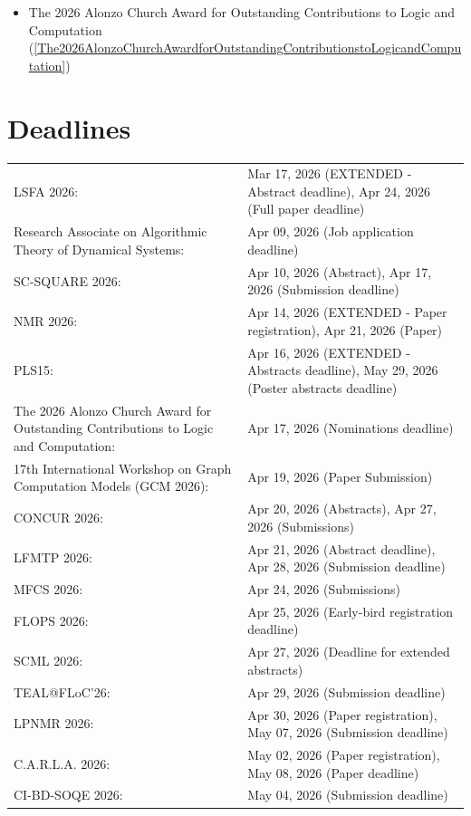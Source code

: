 \documentclass[prodmode,acmtecs]{acmsmall} %
\begin{document}
\begin{itemize}
\begin{itemize}\item The 2026 Alonzo Church Award for Outstanding Contributions to Logic and Computation (\cref{The2026AlonzoChurchAwardforOutstandingContributionstoLogicandComputation})
\end{itemize} 
\end{itemize}\section{Deadlines}\label{deadlines}\begin{tabulary}{\linewidth}{LL}LSFA 2026:  & Mar 17, 2026 (EXTENDED - Abstract deadline), Apr 24, 2026 (Full paper deadline) \\
Research Associate on Algorithmic Theory of Dynamical Systems:  & Apr 09, 2026 (Job application deadline) \\
SC-SQUARE 2026:  & Apr 10, 2026 (Abstract), Apr 17, 2026 (Submission deadline) \\
NMR 2026:  & Apr 14, 2026 (EXTENDED - Paper registration), Apr 21, 2026 (Paper) \\
PLS15:  & Apr 16, 2026 (EXTENDED - Abstracts deadline), May 29, 2026 (Poster abstracts deadline) \\
The 2026 Alonzo Church Award for Outstanding Contributions to Logic and Computation:  & Apr 17, 2026 (Nominations deadline) \\
17th International Workshop on Graph Computation Models  (GCM 2026):  & Apr 19, 2026 (Paper Submission) \\
CONCUR 2026:  & Apr 20, 2026 (Abstracts), Apr 27, 2026 (Submissions) \\
LFMTP 2026:  & Apr 21, 2026 (Abstract  deadline), Apr 28, 2026 (Submission deadline) \\
MFCS 2026:  & Apr 24, 2026 (Submissions) \\
FLOPS 2026:  & Apr 25, 2026 (Early-bird registration deadline) \\
SCML 2026:  & Apr 27, 2026 (Deadline for extended abstracts) \\
TEAL@FLoC'26:  & Apr 29, 2026 (Submission deadline) \\
LPNMR 2026:  & Apr 30, 2026 (Paper registration), May 07, 2026 (Submission deadline) \\
C.A.R.L.A. 2026:  & May 02, 2026 (Paper registration), May 08, 2026 (Paper deadline) \\
CI-BD-SOQE 2026:  & May 04, 2026 (Submission deadline) \\

\end{tabulary}
\end{document}
